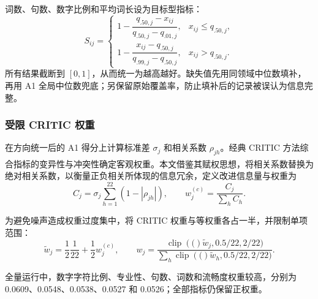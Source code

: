 \documentclass[bwprint]{gmcmthesis}
\newcommand{\clip}[1]{\operatorname{clip}\left(#1\right)}
\numberwithin{equation}{section}
\numberwithin{figure}{section}
\numberwithin{table}{section}
\begin{document}
        词数、句数、数字比例和平均词长设为目标型指标：
        \begin{equation}
        S_{ij}=\begin{cases}
        1-\dfrac{q_{.50,j}-x_{ij}}{q_{.50,j}-q_{.01,j}},&x_{ij}\le q_{.50,j},\\[6pt]
        1-\dfrac{x_{ij}-q_{.50,j}}{q_{.99,j}-q_{.50,j}},&x_{ij}>q_{.50,j}.
        \end{cases}
        \label{eq:target}
        \end{equation}
        所有结果截断到 $[0,1]$，从而统一为越高越好。缺失值先用同领域中位数填补，再用 A1 全局中位数兜底；另保留原始覆盖率，防止填补后的记录被误认为信息完整。
        
        
        \subsubsection{受限 CRITIC 权重}    %
        在方向统一后的 A1 得分上计算标准差 $\sigma_j$ 和相关系数 $\rho_{jh}$。经典 CRITIC 方法综合指标的变异性与冲突性确定客观权重\textsuperscript{\cite{diakoulaki1995critic}}。本文借鉴其赋权思想，将相关系数替换为绝对相关系数，以衡量正负相关所体现的信息冗余，定义改进信息量与权重为
        \begin{equation}
        C_j=\sigma_j\sum_{h=1}^{22}(1-|\rho_{jh}|),\qquad
        w_j^{(c)}=\frac{C_j}{\sum_hC_h}.
        \label{eq:critic}
        \end{equation}
        
        为避免噪声造成权重过度集中，将 CRITIC 权重与等权重各占一半，并限制单项范围：
        \begin{equation}
        \widetilde w_j=\frac12\frac1{22}+\frac12w_j^{(c)},\qquad
        w_j=\frac{\clip(\widetilde w_j,0.5/22,2/22)}
        {\sum_h\clip(\widetilde w_h,0.5/22,2/22)}.
        \label{eq:weight}
        \end{equation}
        
        全量运行中，数字字符比例、专业性、句数、词数和流畅度权重较高，分别为 0.0609、0.0548、0.0538、0.0527 和 0.0526；全部指标仍保留正权重。

        
\end{document}

